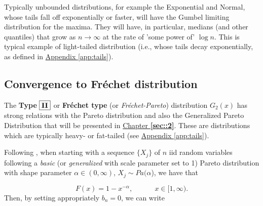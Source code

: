 \vspace{.2cm}
Typically unbounded distributions, for example the Exponential and Normal, whose tails fall off exponentially or faster, will have the Gumbel limiting distribution for the maxima. They will have, in particular, medians (and other quantiles) that grow as $n\rightarrow\infty$ at the rate
of 'some power of' $\log n$. This is typical example of light-tailed distribution (i.e., whose tails decay exponentially, as defined in \hyperref[app:tails]{Appendix \ref{app:tails}}).

\vspace{-.3cm}
\subsection*{Convergence to Fréchet distribution}

The \textbf{Type}  $\boxed{\textbf{\text{II}}}$ or \textbf{Fréchet type} (or \emph{Fréchet-Pareto}) distribution $G_2(x)$ has strong relations with the Pareto distribution and also the Generalized Pareto Distribution that will be presented in \hyperref[sec::2]{Chapter \textbf{\ref{sec::2}}}. These are distributions which are typically heavy- or fat-tailed (see \hyperref[app:tails]{Appendix \ref{app:tails}}).

Following \citet{beirlant_practical_1996}, when starting with a sequence $\{X_j\}$ of $n$ iid random variables following a \textit{basic} (or \textit{generalized} with scale parameter set to 1) Pareto distribution with shape parameter $\alpha\in (0,\infty)$, $X_j\sim Pa(\alpha$), we have that 

\begin{equation}
F(x)=1-x^{-\alpha}, \ \ \ \ \ \ \ \ \ \ \ \ \ \ x\in[1,\infty).
\end{equation}
Then, by setting appropriately $b_n=0$, we can write


